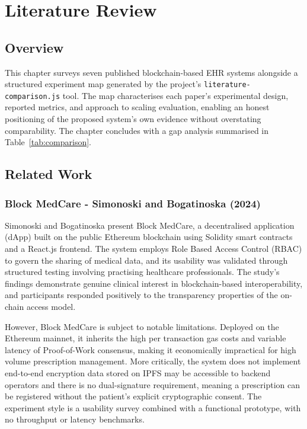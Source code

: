 \documentclass[12pt,a4wide]{report}
\begin{document}
\chapter{Literature Review}

\section{Overview}

This chapter surveys seven published blockchain-based EHR systems alongside a
structured experiment map generated by the project's \texttt{literature-comparison.js}
tool. The map characterises each paper's experimental design, reported metrics,
and approach to scaling evaluation, enabling an honest positioning of the proposed system's
own evidence without overstating comparability. The chapter concludes with a
gap analysis summarised in Table~\ref{tab:comparison}.

\section{Related Work}

\subsection{Block MedCare - Simonoski and Bogatinoska (2024)}

Simonoski and Bogatinoska present Block MedCare, a decentralised application
(dApp) built on the public Ethereum blockchain using Solidity smart contracts and
a React.js frontend. The system employs Role Based Access Control (RBAC) to govern
the sharing of medical data, and its usability was validated through structured
testing involving practising healthcare professionals. The study's findings
demonstrate genuine clinical interest in blockchain-based interoperability, and
participants responded positively to the transparency properties of the on-chain
access model.

However, Block MedCare is subject to notable limitations. Deployed on the Ethereum
mainnet, it inherits the high per transaction gas costs and variable latency of
Proof-of-Work consensus, making it economically impractical for high volume
prescription management. More critically, the system does not implement end-to-end
encryption data stored on IPFS may be accessible to backend operators and
there is no dual-signature requirement, meaning a prescription can be registered
without the patient's explicit cryptographic consent. The experiment style is a
usability survey combined with a functional prototype, with no throughput or
latency benchmarks.
\end{document}

